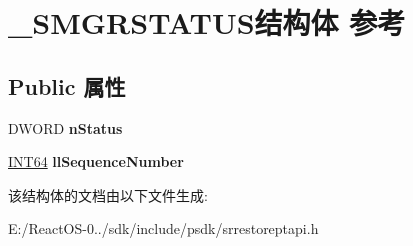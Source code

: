 \hypertarget{struct___s_m_g_r_s_t_a_t_u_s}{}\section{\+\_\+\+S\+M\+G\+R\+S\+T\+A\+T\+U\+S结构体 参考}
\label{struct___s_m_g_r_s_t_a_t_u_s}
\subsection*{Public 属性}
\begin{DoxyCompactItemize}
\item 
\mbox{\label{struct___s_m_g_r_s_t_a_t_u_s_a5697a728013ab714caa1827b4ff05284}} 
D\+W\+O\+RD {\bfseries n\+Status}
\item 
\mbox{\label{struct___s_m_g_r_s_t_a_t_u_s_a23a84d38a4f8d9e3e97498eb86d144cc}} 
\hyperlink{_processor_bind_8h_af16992cf571ce4103a92355761cc471e}{I\+N\+T64} {\bfseries ll\+Sequence\+Number}
\end{DoxyCompactItemize}


该结构体的文档由以下文件生成\+:\begin{DoxyCompactItemize}
\item 
E\+:/\+React\+O\+S-\/0../sdk/include/psdk/srrestoreptapi.\+h\end{DoxyCompactItemize}
